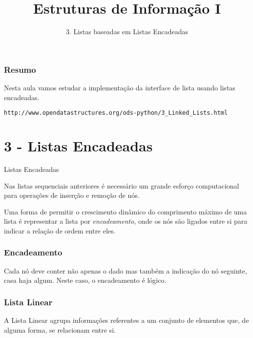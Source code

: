 \documentclass{beamer}
\title[\sc{Estruturas de Informação I}]{Estruturas de Informação I}
\subtitle{3. Listas baseadas em Listas Encadeadas}
\begin{document}
\begin{frame}
  \titlepage
\end{frame}

\begin{frame}
	\frametitle{Resumo}
	Nesta aula vamos estudar a implementação da interface de lista usando listas encadeadas.
	
	{\footnotesize \texttt{http://www.opendatastructures.org/ods-python/3\_Linked\_Lists.html}}
	\tableofcontents
\end{frame}

\section{3 -  Listas Encadeadas}

\begin{frame}
	\LARGE{\alert{Listas Encadeadas}}
	
	\normalsize
	Nas listas sequenciais anteriores é necessário um grande esforço computacional para operações de inserção e remoção de nós.
	
	Uma forma de permitir o crescimento dinâmico do comprimento máximo de uma  lista é representar a lista por \textit{encadeamento}, onde  os nós são ligados entre si para indicar a relação de ordem entre eles.

\end{frame}

\begin{frame}
\frametitle{Encadeamento}
Cada nó deve conter não apenas o dado mas também a indicação do nó seguinte, casa haja algum. Neste caso, o encadeamento é lógico.

\end{frame}

\begin{frame}
\frametitle{Lista Linear}
 A Lista Linear agrupa informações referentes a um conjunto  de  elementos  que,  de  alguma  forma, se relacionam entre si.
\end{frame}
\end{document}
